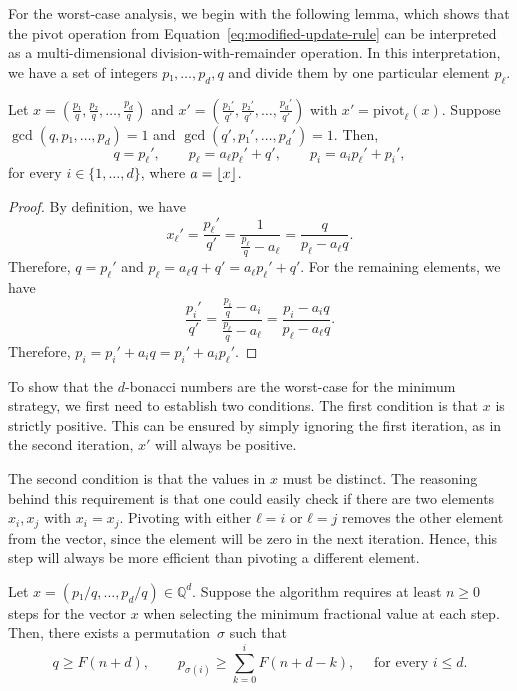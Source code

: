 For the worst-case analysis, we begin with the following lemma, which shows
that the $\mathrm{pivot}$ operation from Equation~\ref{eq:modified-update-rule}
can be interpreted as a multi-dimensional division-with-remainder operation.
In this interpretation, we have a set of integers $p₁, …, p_d, q$ and divide
them by one particular element $p_ℓ$.

\begin{lemma}
  \label{lem:divmod}
  Let $x = \left(\frac{p₁}{q}, \frac{p₂}{q}, …, \frac{p_d}{q}\right)$
  and $x' = \left(\frac{p₁'}{q'}, \frac{p₂'}{q'}, …, \frac{p_d'}{q'}\right)$
  with $x' = \mathrm{pivot}_ℓ(x)$.
  Suppose $\gcd(q, p₁, …, p_d) = 1$ and $\gcd(q', p₁', …, p_d') = 1$.
  Then,
  \[
    q = p_ℓ', \qquad
    p_ℓ = a_ℓ p_ℓ' + q', \qquad
    p_i = a_i p_ℓ' + p_i',
  \]
  for every $i ∈ \{1, …, d\}$, where $a = \left\lfloor x\right\rfloor$.
\end{lemma}

\begin{proof}
  By definition, we have
  \[
    x_ℓ'
    = \frac{p_ℓ'}{q'}
    = \frac{1}{\frac{p_ℓ}{q} - a_ℓ}
    = \frac{q}{p_ℓ - a_ℓ q}.
  \]
  Therefore, $q = p_ℓ'$ and $p_ℓ = a_ℓ q + q' = a_ℓ p_ℓ' + q'$.
  For the remaining elements, we have
  \[
    \frac{p_i'}{q'}
    = \frac{\frac{p_i}{q} - a_i}{\frac{p_ℓ}{q} - a_ℓ}
    = \frac{p_i - a_i q}{p_ℓ - a_ℓ q}.
  \]
  Therefore, $p_i = p_i' + a_i q = p_i' + a_i p_ℓ'$.
\end{proof}

To show that the $d$-bonacci numbers are the worst-case for the minimum
strategy, we first need to establish two conditions.
The first condition is that $x$ is strictly positive.
This can be ensured by simply ignoring the first iteration,
as in the second iteration, $x'$ will always be positive.

The second condition is that the values in $x$ must be distinct.
The reasoning behind this requirement is that one could easily check if there
are two elements $x_i, x_j$ with $x_i = x_j$.
Pivoting with either $ℓ = i$ or $ℓ = j$ removes the other element from the
vector, since the element will be zero in the next iteration.
Hence, this step will always be more efficient than pivoting a different element.

\begin{theorem}
  \label{thm:dbonacci}
  Let $x = (p₁/q, …, p_d/q) ∈ ℚ^d$.
  Suppose the algorithm requires at least $n ≥ 0$ steps for the vector $x$ when
  selecting the minimum fractional value at each step.
  Then, there exists a permutation~$σ$ such that
  \[
    q ≥ F(n+d), \qquad
    p_{σ(i)} ≥ \sum_{k = 0}^i F(n+d - k),
    \quad \text{ for every } i ≤ d.
  \]
\end{theorem}

